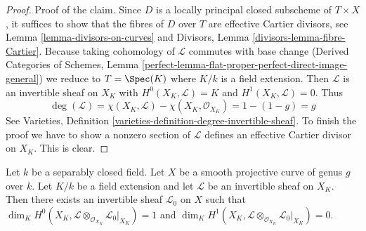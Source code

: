 \begin{proof}
\medskip\noindent
Proof of the claim. Since $D$ is a locally principal closed subscheme
of $T \times X$, it suffices to show that the fibres of $D$ over $T$ are
effective Cartier divisors, see Lemma \ref{lemma-divisors-on-curves} and
Divisors, Lemma \ref{divisors-lemma-fibre-Cartier}. Because taking
cohomology of $\mathcal{L}$ commutes with base change
(Derived Categories of Schemes, Lemma
\ref{perfect-lemma-flat-proper-perfect-direct-image-general})
we reduce to $T = \Spec(K)$ where $K/k$ is a field extension.
Then $\mathcal{L}$ is an invertible sheaf on $X_K$ with
$H^0(X_K, \mathcal{L}) = K$ and $H^1(X_K, \mathcal{L}) = 0$. Thus
$$
\deg(\mathcal{L}) = \chi(X_K, \mathcal{L}) - \chi(X_K, \mathcal{O}_{X_K})
= 1 - (1 - g) = g
$$
See Varieties, Definition \ref{varieties-definition-degree-invertible-sheaf}.
To finish the proof we have to show a nonzero section of $\mathcal{L}$
defines an effective Cartier divisor on $X_K$.
This is clear.
\end{proof}

\begin{lemma}
\label{lemma-twist-with-general-divisor}
Let $k$ be a separably closed field. Let $X$ be a smooth projective
curve of genus $g$ over $k$. Let $K/k$ be a field extension and let
$\mathcal{L}$ be an invertible sheaf on $X_K$. Then there exists an
invertible sheaf $\mathcal{L}_0$ on $X$ such that
$\dim_K H^0(X_K,
\mathcal{L} \otimes_{\mathcal{O}_{X_K}} \mathcal{L}_0|_{X_K}) = 1$ and
$\dim_K H^1(X_K,
\mathcal{L} \otimes_{\mathcal{O}_{X_K}} \mathcal{L}_0|_{X_K}) = 0$.
\end{lemma}

